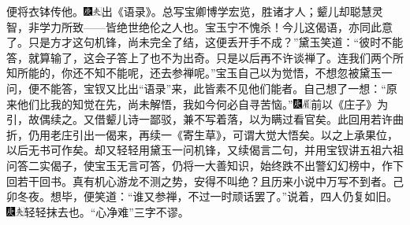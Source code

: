 便将衣钵传他。{\includegraphics[width=3mm]{../Images/00004}\includegraphics[width=3mm]{../Images/00012}\footnotesize \kaishu 出《语录》。总写宝卿博学宏览，胜诸才人；颦儿却聪慧灵智，非学力所致------皆绝世绝伦之人也。宝玉宁不愧杀！}今儿这偈语，亦同此意了。只是方才这句机锋，尚未完全了结，这便丢开手不成？”黛玉笑道：“彼时不能答，就算输了，这会子答上了也不为出奇。只是以后再不许谈禅了。连我们两个所知所能的，你还不知不能呢，还去参禅呢。”宝玉自己以为觉悟，不想忽被黛玉一问，便不能答，宝钗又比出“语录”来，此皆素不见他们能者。自己想了一想：“原来他们比我的知觉在先，尚未解悟，我如今何必自寻苦恼。”{\includegraphics[width=3mm]{../Images/00004}\includegraphics[width=3mm]{../Images/00010}\footnotesize \kaishu 前以《庄子》为引，故偶续之。又借颦儿诗一鄙驳，兼不写着落，以为瞒过看官矣。此回用若许曲折，仍用老庄引出一偈来，再续一《寄生草》，可谓大觉大悟矣。以之上承果位，以后无书可作矣。却又轻轻用黛玉一问机锋，又续偈言二句，并用宝钗讲五祖六祖问答二实偈子，使宝玉无言可答，仍将一大善知识，始终跌不出警幻幻榜中，作下回若干回书。真有机心游龙不测之势，安得不叫绝？且历来小说中万写不到者。己卯冬夜。}想毕，便笑道：“谁又参禅，不过一时顽话罢了。”说着，四人仍复如旧。{\includegraphics[width=3mm]{../Images/00004}\includegraphics[width=3mm]{../Images/00012}\footnotesize \kaishu 轻轻抹去也。“心净难”三字不谬。}

